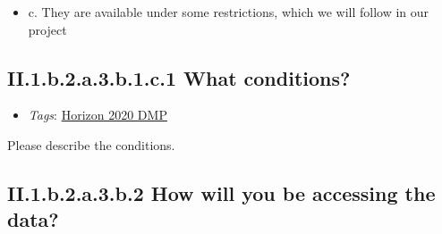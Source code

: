 \documentclass[a4paper,12pt]{report}
\begin{document}
\begin{itemize}
  \item[\CheckmarkBold] c. They are available under some restrictions, which we will follow in our project
\end{itemize}




\subsection*{\protect\textcolor{colorSecId}{II.1.b.2.a.3.b.1.c.1} What conditions?}

\label{82fd0cce-2b41-423f-92ad-636d0872045c.efc80cc8-8318-4f8c-acb7-dc1c60e491c1.2663b978-5125-4224-9930-0a50dbe895c9.be872000-cb98-442f-999c-ca3ef58dcfe8.c8bd43ef-4b52-48d9-be2a-7f51dad8d3c4.f5e129dc-d59d-4352-a5ed-25efe1d83811.7fc8d3c9-a2d5-4d47-9df4-56af48ca85e1.69999c2c-2710-480e-b8ac-8a8fc6f582e5.97dc091d-8103-4119-87a2-c46a277ea303.283abe36-207b-42c3-8d8e-ec9343d6f6fd}


\begin{itemize}
  \item \textit{Tags}: \ul{Horizon 2020 DMP}
  \end{itemize}


\noindent
\begin{markdown}
Please describe the conditions.
\end{markdown}



\subsection*{\protect\textcolor{colorSecId}{II.1.b.2.a.3.b.2} How will you be accessing the data?}

\label{82fd0cce-2b41-423f-92ad-636d0872045c.efc80cc8-8318-4f8c-acb7-dc1c60e491c1.2663b978-5125-4224-9930-0a50dbe895c9.be872000-cb98-442f-999c-ca3ef58dcfe8.c8bd43ef-4b52-48d9-be2a-7f51dad8d3c4.f5e129dc-d59d-4352-a5ed-25efe1d83811.7fc8d3c9-a2d5-4d47-9df4-56af48ca85e1.62ddfc73-1680-4bbf-b198-6a7231875fb1}
\end{document}
